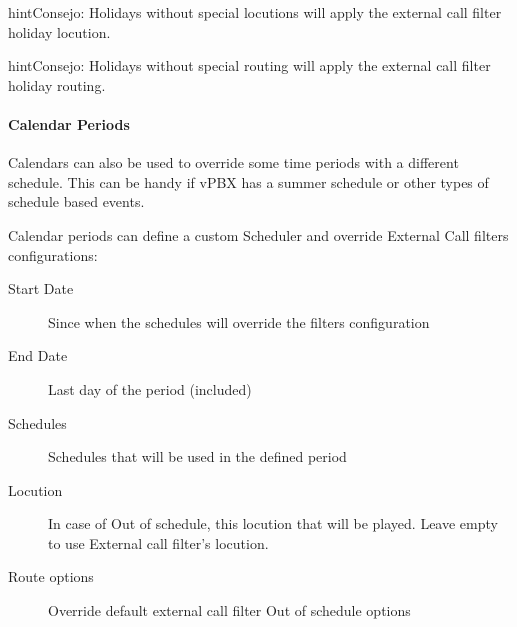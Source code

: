 \documentclass[letterpaper,10pt,spanish]{sphinxmanual}
\begin{document}
\begin{notice}{hint}{Consejo:}
Holidays without special locutions will apply the external call filter
holiday locution.
\end{notice}

\begin{notice}{hint}{Consejo:}
Holidays without special routing will apply the external call filter
holiday routing.
\end{notice}


\paragraph{Calendar Periods}
\label{administration_portal/client/vpbx/routing_tools/calendars:calendar-periods}
Calendars can also be used to override some time periods with a different schedule.
This can be handy if vPBX has a summer schedule or other types of schedule based events.

Calendar periods can define a custom Scheduler and override External Call filters configurations:
\begin{description}
\item[{Start Date}] \leavevmode{}\label{administration_portal/client/vpbx/routing_tools/calendars:term-start-date}
Since when the schedules will override the filters configuration

\item[{End Date}] \leavevmode{}\label{administration_portal/client/vpbx/routing_tools/calendars:term-end-date}
Last day of the period (included)

\item[{Schedules}] \leavevmode{}\label{administration_portal/client/vpbx/routing_tools/calendars:term-schedules}
Schedules that will be used in the defined period

\item[{Locution}] \leavevmode{}\label{administration_portal/client/vpbx/routing_tools/calendars:term-9}
In case of Out of schedule, this locution that will be played. Leave empty to use External
call filter's locution.

\item[{Route options}] \leavevmode{}\label{administration_portal/client/vpbx/routing_tools/calendars:term-route-options}
Override default external call filter Out of schedule options

\end{description}
\end{document}
